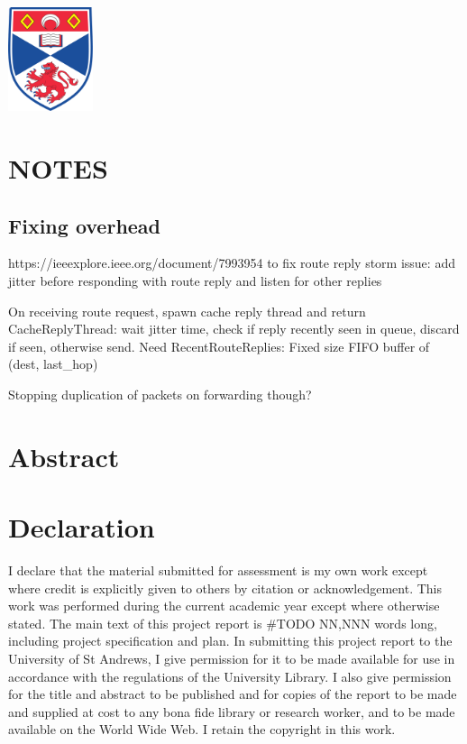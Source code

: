 \documentclass[12pt]{article}
\begin{document}
\begin{titlepage}
\includegraphics[width = 2.5cm]{images/standrewslogo.png}
 

\vfill %

\end{titlepage}


\section{NOTES}

\subsection{Fixing overhead}

https://ieeexplore.ieee.org/document/7993954 to fix route reply storm issue: add jitter before responding with route reply and listen for other replies

On receiving route request, spawn cache reply thread and return
CacheReplyThread: wait jitter time, check if reply recently seen in queue, discard if seen, otherwise send.
Need RecentRouteReplies: Fixed size FIFO buffer of (dest, last_hop)



Stopping duplication of packets on forwarding though?

\section*{Abstract}



\section*{Declaration}
I declare that the material submitted for
assessment is my own work except where credit is
explicitly given to others by citation or
acknowledgement. This work was performed during
the current academic year except where otherwise
stated.
The main text of this project report is \#TODO NN,NNN
words long, including project specification and plan.
In submitting this project report to the University of
St Andrews, I give permission for it to be made
available for use in accordance with the regulations of
the University Library. I also give permission for
the title and abstract to be published and for copies of
the report to be made and supplied at cost to any bona
fide library or research worker, and to be made
available on the World Wide Web. I retain the
copyright in this work.
\end{document}
